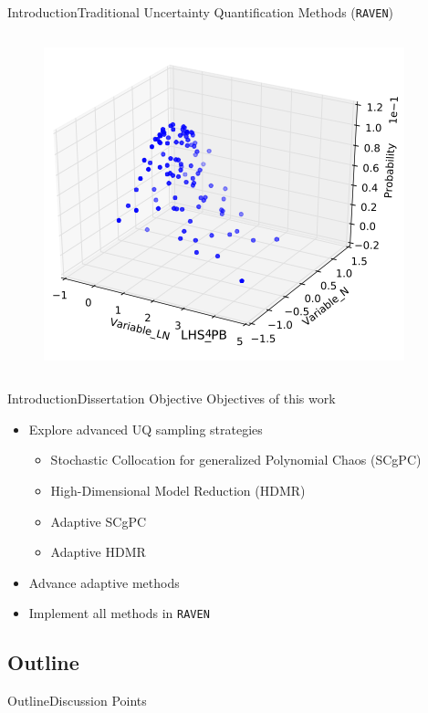 \documentclass{beamer}
\newcommand{\raven}{\texttt{RAVEN}}
\begin{document}
\begin{frame}{Introduction}{Traditional Uncertainty Quantification Methods (\raven{})}
\begin{columns}
\begin{column}{0.45\textwidth}
\begin{figure}[h!]
    \end{figure}
    \vspace{-10pt}
    \begin{figure}[h!]
      \centering
      \includegraphics[width=0.4\linewidth]{lhs_prob}
    \end{figure}
  \end{column}
  \end{columns}
\end{frame}


\begin{frame}{Introduction}{Dissertation Objective}\vspace{-20pt}
  \vfill
Objectives of this work
  \vfill
\begin{itemize}
  \item Explore advanced UQ sampling strategies
    \begin{itemize}
      \item Stochastic Collocation for generalized Polynomial Chaos (SCgPC)
      \item High-Dimensional Model Reduction (HDMR)
      \item Adaptive SCgPC
      \item Adaptive HDMR
    \end{itemize}
  \vfill
  \item Advance adaptive methods
  \vfill
  \item Implement all methods in \raven{}
\end{itemize}
  \vfill
\end{frame}





\subsection{Outline}
\begin{frame}{Outline}{Discussion Points}\vspace{-20pt}
  \begin{columns}
  \begin{column}{0.1\textwidth}
  \end{column}
  \begin{column}{0.9\textwidth}
    \setcounter{tocdepth}{1}
    \tableofcontents[hideothersubsections]%
  \end{column}
  \end{columns}
\end{frame}
\end{document}
